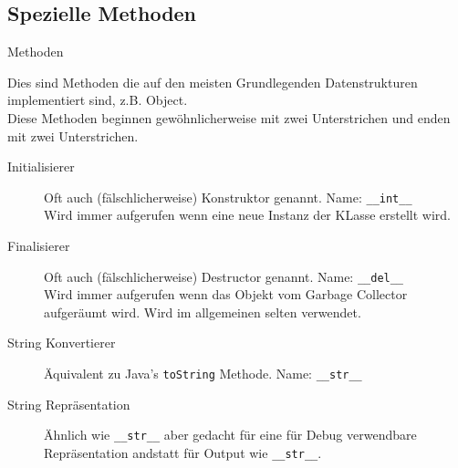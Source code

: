 \subsection{Spezielle Methoden}
\begin{frame}[fragile]{Methoden}

Dies sind Methoden die auf den meisten Grundlegenden Datenstrukturen implementiert sind, z.B. Object.\\
Diese Methoden beginnen gewöhnlicherweise mit zwei Unterstrichen und enden mit zwei Unterstrichen.

\begin{description}
	\item[Initialisierer] Oft auch (fälschlicherweise) Konstruktor genannt. Name: \texttt{\_\_int\_\_}\\
		Wird immer aufgerufen wenn eine neue Instanz der KLasse erstellt wird.
	\item[Finalisierer] Oft auch (fälschlicherweise) Destructor genannt. Name: \texttt{\_\_del\_\_}\\
		Wird immer aufgerufen wenn das Objekt vom Garbage Collector aufgeräumt wird. Wird im allgemeinen selten verwendet.
	\item[String Konvertierer] Äquivalent zu Java's \texttt{toString} Methode. Name: \texttt{\_\_str\_\_}
	\item[String Repräsentation] Ähnlich wie \texttt{\_\_str\_\_} aber gedacht für eine für Debug verwendbare Repräsentation andstatt für Output wie \texttt{\_\_str\_\_}.
\end{description}

\end{frame}




